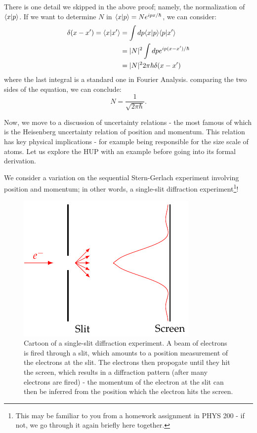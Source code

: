 There is one detail we skipped in the above proof; namely, the normalization of $\langle x \lvert p \rangle$. If we want to determine $N$ in $\langle x \lvert p \rangle = Ne^{ipx/\hbar}$, we can consider:
\begin{equation}
    \begin{split}
        \delta(x - x') = \langle x \lvert x' \rangle &= \int dp \langle x \lvert p \rangle\langle p \lvert x' \rangle
        \\ &= \lvert N \rvert^2\int dp e^{ip(x - x')/\hbar}
        \\ &= \lvert N \rvert^2 2\pi\hbar \delta(x - x')
    \end{split}
\end{equation}
where the last integral is a standard one in Fourier Analysis. comparing the two sides of the equation, we can conclude:
\begin{equation}
    N = \frac{1}{\sqrt{2\pi\hbar}}.
\end{equation}

Now, we move to a discussion of uncertainty relations - the most famous of which is the Heisenberg uncertainty relation of position and momentum. This relation has key physical implications - for example being responsible for the size scale of atoms. Let us explore the HUP with an example before going into its formal derivation.

We consider a variation on the sequential Stern-Gerlach experiment involving position and momentum; in other words, a single-slit diffraction experiment\footnote{This may be familiar to you from a homework assignment in PHYS 200 - if not, we go through it again briefly here together.}!

\begin{figure}[htbp]
    \centering
    \includegraphics[]{Images/fig-singleslitdiffraction.pdf}
    
    \caption{Cartoon of a single-slit diffraction experiment. A beam of electrons is fired through a slit, which amounts to a position measurement of the electrons at the slit. The electrons then propogate until they hit the screen, which results in a diffraction pattern (after many electrons are fired) - the momentum of the electron at the slit can then be inferred from the position which the electron hits the screen.}
    \label{fig-singleslitdiffraction}
\end{figure}

